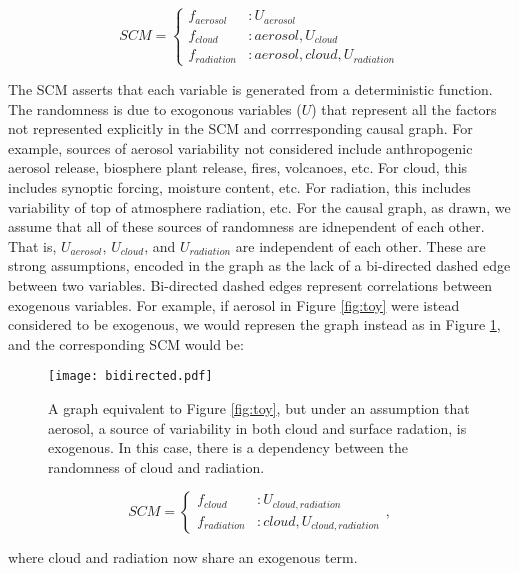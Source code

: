 \documentclass[12pt]{article}
\begin{document}
\begin{equation}
  SCM =
  \begin{cases}
    f_{aerosol} &: U_{aerosol} \\
    f_{cloud} &: aerosol, U_{cloud}  \\
    f_{radiation} &: aerosol, cloud, U_{radiation}
  \end{cases}
  \label{eq:1}
\end{equation}

The SCM asserts that each variable is generated from a deterministic
function. The randomness is due to exogonous variables ($U$) that
represent all the factors not represented explicitly in the SCM and
corrresponding causal graph. For example, sources of aerosol
variability not considered include anthropogenic aerosol release,
biosphere plant release, fires, volcanoes, etc. For cloud, this
includes synoptic forcing, moisture content, etc. For radiation, this
includes variability of top of atmosphere radiation, etc. For the
causal graph, as drawn, we assume that all of these sources of
randomness are idnependent of each other. That is, $U_{aerosol}$,
$U_{cloud}$, and $U_{radiation}$ are independent of each other. These
are strong assumptions, encoded in the graph as the lack of a
bi-directed dashed edge between two variables. Bi-directed dashed
edges represent correlations between exogenous variables. For example,
if aerosol in Figure \ref{fig:toy} were istead considered to be
exogenous, we would represen the graph instead as in Figure
\ref{fig:bi-directed}, and the corresponding SCM would be:

\begin{figure}
  \texttt{[image: bidirected.pdf]}
  \caption{A graph equivalent to Figure \ref{fig:toy}, but under an
    assumption that aerosol, a source of variability in both cloud and
    surface radation, is exogenous. In this case, there is a dependency
    between the randomness of cloud and radiation.}
  \label{fig:bi-directed}
\end{figure}

\begin{equation}
  SCM =
  \begin{cases}
    f_{cloud} &: U_{cloud,radiation}  \\
    f_{radiation} &: cloud, U_{cloud,radiation}
  \end{cases},
  \label{eq:2}
\end{equation}

where cloud and radiation now share an exogenous term.
\end{document}
